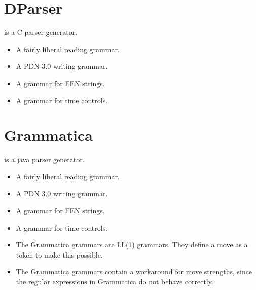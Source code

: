 \documentclass[letterpaper,10pt,english]{sphinxmanual}
\begin{document}
\section{DParser}
\label{\detokenize{implementation:dparser}}
\sphinxAtStartPar
{} is a C parser generator.
\begin{itemize}
\item {} 
\sphinxAtStartPar
{} A fairly liberal reading grammar.

\item {} 
\sphinxAtStartPar
{} A PDN 3.0 writing grammar.

\item {} 
\sphinxAtStartPar
{} A grammar for FEN strings.

\item {} 
\sphinxAtStartPar
{} A grammar for time controls.

\end{itemize}


\section{Grammatica}
\label{\detokenize{implementation:grammatica}}
\sphinxAtStartPar
{} is a java parser generator.
\begin{itemize}
\item {} 
\sphinxAtStartPar
{} A fairly liberal reading grammar.

\item {} 
\sphinxAtStartPar
{} A PDN 3.0 writing grammar.

\item {} 
\sphinxAtStartPar
{} A grammar for FEN strings.

\item {} 
\sphinxAtStartPar
{} A grammar for time controls.

\end{itemize}
\begin{itemize}
\item {} 
\sphinxAtStartPar
The Grammatica grammars are LL(1) grammars. They define a move as a token to make this possible.

\item {} 
\sphinxAtStartPar
The Grammatica grammars contain a workaround for move strengths, since the regular expressions in Grammatica do not behave correctly.

\end{itemize}
\end{document}
